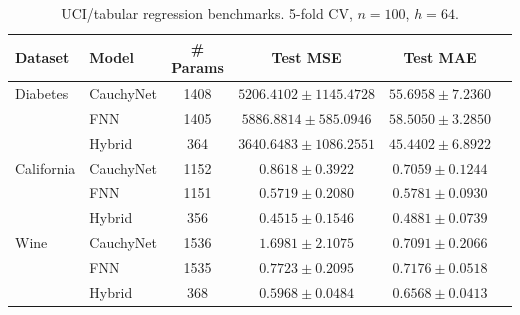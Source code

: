 \begin{table}[ht]\centering
\caption{UCI/tabular regression benchmarks. 5-fold CV, $n=100$, $h=64$.}
\label{tab:uci}
\begin{tabular}{llcccc}
\toprule
Dataset & Model & \# Params & Test MSE & Test MAE \\
\midrule
Diabetes & CauchyNet & 1408 & $5206.4102 \pm 1145.4728$ & $55.6958 \pm 7.2360$ \\
 & FNN & 1405 & $5886.8814 \pm 585.0946$ & $58.5050 \pm 3.2850$ \\
 & Hybrid & 364 & $3640.6483 \pm 1086.2551$ & $45.4402 \pm 6.8922$ \\
\midrule
California & CauchyNet & 1152 & $0.8618 \pm 0.3922$ & $0.7059 \pm 0.1244$ \\
 & FNN & 1151 & $0.5719 \pm 0.2080$ & $0.5781 \pm 0.0930$ \\
 & Hybrid & 356 & $0.4515 \pm 0.1546$ & $0.4881 \pm 0.0739$ \\
\midrule
Wine & CauchyNet & 1536 & $1.6981 \pm 2.1075$ & $0.7091 \pm 0.2066$ \\
 & FNN & 1535 & $0.7723 \pm 0.2095$ & $0.7176 \pm 0.0518$ \\
 & Hybrid & 368 & $0.5968 \pm 0.0484$ & $0.6568 \pm 0.0413$ 
\bottomrule
\end{tabular}
\end{table}